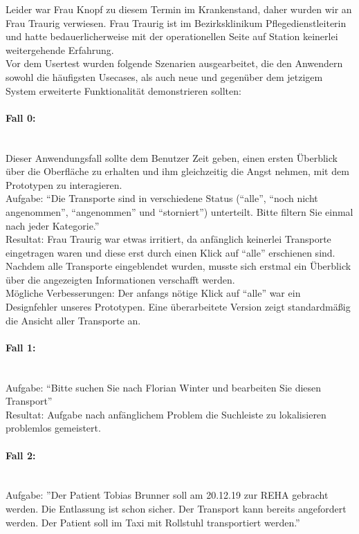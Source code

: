 \documentclass[a4paper, ngerman, 12pt]{scrartcl}
\begin{document}
Leider war Frau Knopf zu diesem Termin im Krankenstand, daher wurden wir an Frau Traurig verwiesen. Frau Traurig ist im Bezirksklinikum Pflegedienstleiterin und hatte bedauerlicherweise mit der operationellen Seite auf Station keinerlei weitergehende Erfahrung.\\
 
Vor dem Usertest wurden folgende Szenarien ausgearbeitet, die den Anwendern sowohl die häufigsten Usecases, als auch neue und gegenüber dem jetzigem System erweiterte Funktionalität demonstrieren sollten:

\paragraph{Fall 0:}\leavevmode\\
Dieser Anwendungsfall sollte dem Benutzer Zeit geben, einen ersten Überblick über die Oberfläche zu erhalten und ihm gleichzeitig die Angst nehmen, mit dem Prototypen zu interagieren.\\
 
Aufgabe: “Die Transporte sind in verschiedene Status (“alle”, “noch nicht angenommen”, “angenommen” und “storniert”) unterteilt. Bitte filtern Sie einmal nach jeder Kategorie.”\\
 
Resultat: Frau Traurig war etwas irritiert, da anfänglich keinerlei Transporte eingetragen waren und diese erst durch einen Klick auf “alle” erschienen sind. Nachdem alle Transporte eingeblendet wurden, musste sich erstmal ein Überblick über die angezeigten Informationen verschafft werden.\\
 
Mögliche Verbesserungen: Der anfangs nötige Klick auf “alle” war ein Designfehler unseres Prototypen. Eine überarbeitete Version zeigt standardmäßig die Ansicht aller Transporte an.

\paragraph{Fall 1:}\leavevmode\\
Aufgabe: “Bitte suchen Sie nach Florian Winter und bearbeiten Sie diesen Transport”\\
 
Resultat: Aufgabe nach anfänglichem Problem die Suchleiste zu lokalisieren problemlos gemeistert.

\paragraph{Fall 2:}\leavevmode\\
Aufgabe: ”Der Patient Tobias Brunner soll am 20.12.19 zur REHA gebracht werden. Die Entlassung ist schon sicher. Der Transport kann bereits angefordert werden. Der Patient soll im Taxi mit Rollstuhl transportiert werden.”\\
 
\end{document}
